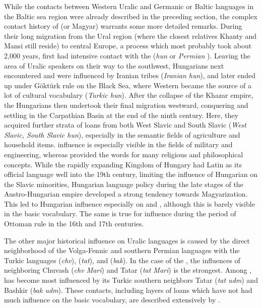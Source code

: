 While the contacts between Western Uralic and Germanic or Baltic languages in the Baltic sea region were already described in the preceding section, the complex contact history of  (or Magyar) warrants some more detailed remarks. During their long migration from the Ural region (where the closest relatives Khanty and Mansi still reside) to central Europe, a process which most probably took about 2,000 years,  first had intensive contact with the  (\textit{hun}  or \textit{Permian} ). Leaving the area of Uralic speakers on their way to the southwest, Hungarians next encountered and were influenced by Iranian tribes (\textit{Iranian \arrowLA hun}), and later ended up under G\"okt\"urk rule on the Black Sea, where Western  became the source of a lot of cultural vocabulary (\textit{Turkic \arrowLA hun}). After the collapse of the Khazar empire, the Hungarians then undertook their final migration westward, conquering and settling in the Carpathian Basin at the end of the ninth century. Here, they acquired further strata of loans from both West Slavic and South Slavic (\textit{West Slavic, South Slavic \arrowLA hun}), especially in the semantic fields of agriculture and household items.  influence is especially visible in the fields of military and engineering, whereas  provided the words for many religious and philosophical concepts. While the rapidly expanding Kingdom of Hungary had Latin as its official language well into the 19th century, limiting the influence of Hungarian on the Slavic minorities, Hungarian language policy during the late stages of the Austro-Hungarian empire developed a strong tendency towards Magyarization. This led to Hungarian influence especially on  and , although this is barely visible in the basic vocabulary. The same is true for  influence during the period of Ottoman rule in the 16th and 17th centuries.

The other major historical influence on Uralic languages is caused by the direct neighborhood of the Volga-Fennic and southern Permian languages with the Turkic languages  (\textit{chv}),  (\textit{tat}), and  (\textit{bak}). In the case of the , the influences of neighboring Chuvash (\textit{chv \arrowLA Mari}) and Tatar (\textit{tat \arrowLA Mari}) is the strongest. Among ,  has become most influenced by its Turkic southern neighbors Tatar (\textit{tat \arrowLA udm}) and Bashkir (\textit{bak \arrowLA udm}). These contacts, including layers of loans which have not had much influence on the basic vocabulary, are described extensively by \cite{rona-tas1988}.

